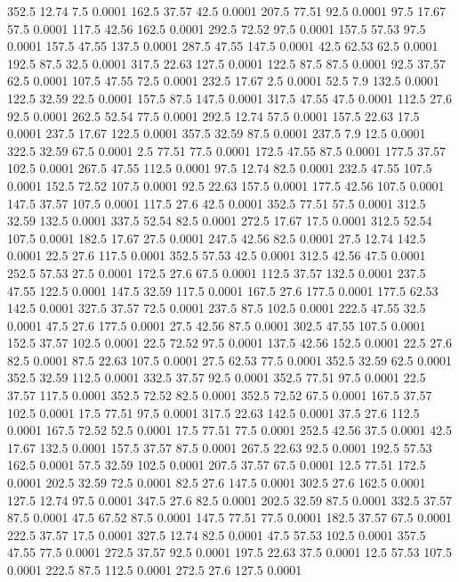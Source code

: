 352.5	12.74	7.5	0.0001
162.5	37.57	42.5	0.0001
207.5	77.51	92.5	0.0001
97.5	17.67	57.5	0.0001
117.5	42.56	162.5	0.0001
292.5	72.52	97.5	0.0001
157.5	57.53	97.5	0.0001
157.5	47.55	137.5	0.0001
287.5	47.55	147.5	0.0001
42.5	62.53	62.5	0.0001
192.5	87.5	32.5	0.0001
317.5	22.63	127.5	0.0001
122.5	87.5	87.5	0.0001
92.5	37.57	62.5	0.0001
107.5	47.55	72.5	0.0001
232.5	17.67	2.5	0.0001
52.5	7.9	132.5	0.0001
122.5	32.59	22.5	0.0001
157.5	87.5	147.5	0.0001
317.5	47.55	47.5	0.0001
112.5	27.6	92.5	0.0001
262.5	52.54	77.5	0.0001
292.5	12.74	57.5	0.0001
157.5	22.63	17.5	0.0001
237.5	17.67	122.5	0.0001
357.5	32.59	87.5	0.0001
237.5	7.9	12.5	0.0001
322.5	32.59	67.5	0.0001
2.5	77.51	77.5	0.0001
172.5	47.55	87.5	0.0001
177.5	37.57	102.5	0.0001
267.5	47.55	112.5	0.0001
97.5	12.74	82.5	0.0001
232.5	47.55	107.5	0.0001
152.5	72.52	107.5	0.0001
92.5	22.63	157.5	0.0001
177.5	42.56	107.5	0.0001
147.5	37.57	107.5	0.0001
117.5	27.6	42.5	0.0001
352.5	77.51	57.5	0.0001
312.5	32.59	132.5	0.0001
337.5	52.54	82.5	0.0001
272.5	17.67	17.5	0.0001
312.5	52.54	107.5	0.0001
182.5	17.67	27.5	0.0001
247.5	42.56	82.5	0.0001
27.5	12.74	142.5	0.0001
22.5	27.6	117.5	0.0001
352.5	57.53	42.5	0.0001
312.5	42.56	47.5	0.0001
252.5	57.53	27.5	0.0001
172.5	27.6	67.5	0.0001
112.5	37.57	132.5	0.0001
237.5	47.55	122.5	0.0001
147.5	32.59	117.5	0.0001
167.5	27.6	177.5	0.0001
177.5	62.53	142.5	0.0001
327.5	37.57	72.5	0.0001
237.5	87.5	102.5	0.0001
222.5	47.55	32.5	0.0001
47.5	27.6	177.5	0.0001
27.5	42.56	87.5	0.0001
302.5	47.55	107.5	0.0001
152.5	37.57	102.5	0.0001
22.5	72.52	97.5	0.0001
137.5	42.56	152.5	0.0001
22.5	27.6	82.5	0.0001
87.5	22.63	107.5	0.0001
27.5	62.53	77.5	0.0001
352.5	32.59	62.5	0.0001
352.5	32.59	112.5	0.0001
332.5	37.57	92.5	0.0001
352.5	77.51	97.5	0.0001
22.5	37.57	117.5	0.0001
352.5	72.52	82.5	0.0001
352.5	72.52	67.5	0.0001
167.5	37.57	102.5	0.0001
17.5	77.51	97.5	0.0001
317.5	22.63	142.5	0.0001
37.5	27.6	112.5	0.0001
167.5	72.52	52.5	0.0001
17.5	77.51	77.5	0.0001
252.5	42.56	37.5	0.0001
42.5	17.67	132.5	0.0001
157.5	37.57	87.5	0.0001
267.5	22.63	92.5	0.0001
192.5	57.53	162.5	0.0001
57.5	32.59	102.5	0.0001
207.5	37.57	67.5	0.0001
12.5	77.51	172.5	0.0001
202.5	32.59	72.5	0.0001
82.5	27.6	147.5	0.0001
302.5	27.6	162.5	0.0001
127.5	12.74	97.5	0.0001
347.5	27.6	82.5	0.0001
202.5	32.59	87.5	0.0001
332.5	37.57	87.5	0.0001
47.5	67.52	87.5	0.0001
147.5	77.51	77.5	0.0001
182.5	37.57	67.5	0.0001
222.5	37.57	17.5	0.0001
327.5	12.74	82.5	0.0001
47.5	57.53	102.5	0.0001
357.5	47.55	77.5	0.0001
272.5	37.57	92.5	0.0001
197.5	22.63	37.5	0.0001
12.5	57.53	107.5	0.0001
222.5	87.5	112.5	0.0001
272.5	27.6	127.5	0.0001
